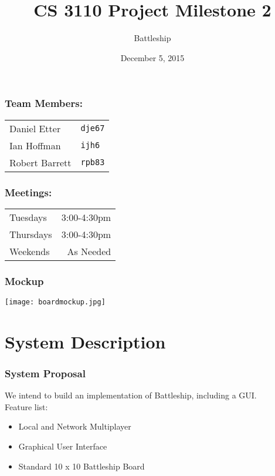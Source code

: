 \documentclass[10pt]{article}
\title{CS 3110 Project Milestone 2}
\author{Battleship}
\date{December 5, 2015}
\begin{document}
\maketitle

\section*{Team Members:}
\begin{tabular}{l l}
Daniel Etter & \texttt{dje67}\\
Ian Hoffman & \texttt{ijh6}\\
Robert Barrett & \texttt{rpb83}\\
\end{tabular}

\section*{Meetings:}
\begin{tabular}{l r}
Tuesdays & 3:00-4:30pm \\
Thursdays & 3:00-4:30pm \\
Weekends & As Needed \\
\end{tabular}

\section*{Mockup}
\texttt{[image: boardmockup.jpg]}

\clearpage
\part*{System Description}
\section*{System Proposal}
We intend to build an implementation of Battleship, including a GUI. \\
Feature list:
\begin{itemize}
    \item Local and Network Multiplayer
    \item Graphical User Interface
    \item Standard 10 x 10 Battleship Board
\end{itemize}
\end{document}
